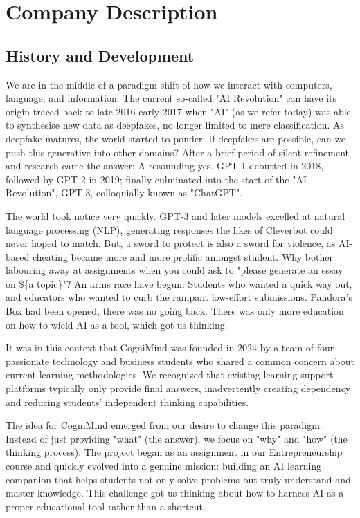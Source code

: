 \def\code#1{\texttt{#1}}

\section{Company Description}

\subsection{History and Development}
We are in the middle of a paradigm shift of how we interact with computers, language, and information. The current
so-called "AI Revolution" can have its origin traced back to late 2016-early 2017 when "AI" (as we refer today) was
able to synthesise new data as deepfakes, no longer limited to mere classification. As deepfake matures, the world
started to ponder: If deepfakes are possible, can we push this generative into other domains? After a brief period of
silent refinement and research came the answer: A resounding yes. GPT-1 debutted in 2018, followed by GPT-2 in 2019;
finally culminated into the start of the "AI Revolution", GPT-3, colloquially known as "ChatGPT".

The world took notice very quickly. GPT-3 and later models excelled at natural language processing (NLP), generating
responses the likes of Cleverbot could never hoped to match. But, a sword to protect is also a sword for violence, as
AI-based cheating became more and more prolific amongst student. Why bother labouring away at assignments when you
could ask to "please generate an essay on \$\{a topic\}"? An arms race have begun: Students who wanted a quick way out,
and educators who wanted to curb the rampant low-effort submissions. Pandora's Box had been opened, there was no going
back. There was only more education on how to wield AI as a tool, which got us thinking.

It was in this context that CogniMind was founded in 2024 by a team of four passionate technology and business students
who shared a common concern about current learning methodologies. We recognized that existing learning support
platforms typically only provide final answers, inadvertently creating dependency and reducing students' independent
thinking capabilities.

The idea for CogniMind emerged from our desire to change this paradigm. Instead of just providing "what" (the answer),
we focus on "why" and "how" (the thinking process). The project began as an assignment in our Entrepreneurship course
and quickly evolved into a genuine mission: building an AI learning companion that helps students not only solve
problems but truly understand and master knowledge. This challenge got us thinking about how to harness AI as a proper
educational tool rather than a shortcut.

